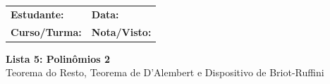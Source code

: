\documentclass[12pt,a4paper]{article}
\begin{document}
\begin{tcolorbox}[colback=bglight, colframe=primary, boxrule=1pt, arc=3pt]
  \sffamily\small
  \begin{tabular}{@{}p{} p{}@{}}
    \textbf{Estudante:} \hrulefill & \textbf{Data:} \hrulefill \\[0.25cm]
    \textbf{Curso/Turma:} \hrulefill & \textbf{Nota/Visto:} \hrulefill
  \end{tabular}
\end{tcolorbox}

\begin{center}
  {\LARGE\bfseries\color{primary} Lista 5: Polinômios 2} \\[0.1cm]
  {\small\sffamily\color{gray} Teorema do Resto, Teorema de D'Alembert e Dispositivo de Briot-Ruffini}
\end{center}

\vspace{0.1cm}
\end{document}
